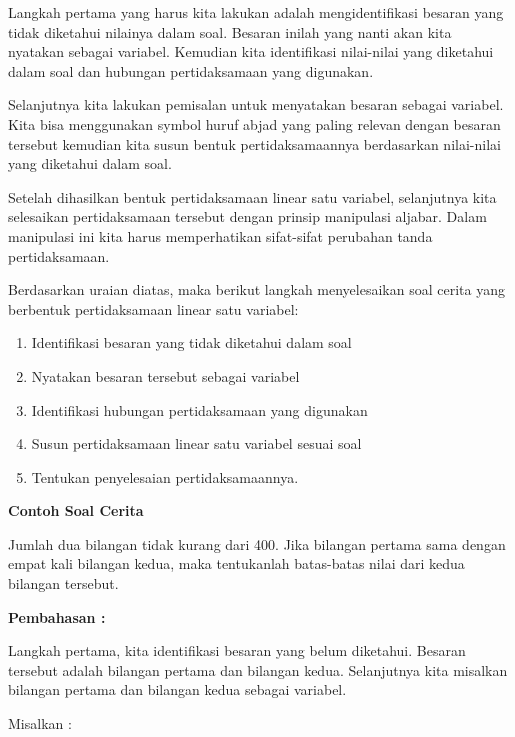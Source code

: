 \documentclass[11pt,fleqn]{book} %
\begin{document}
\noindent Langkah pertama yang harus kita lakukan adalah mengidentifikasi besaran yang tidak diketahui nilainya dalam soal. Besaran inilah yang nanti akan kita nyatakan sebagai variabel. Kemudian kita identifikasi nilai-nilai yang diketahui dalam soal dan hubungan pertidaksamaan yang digunakan.

\noindent Selanjutnya kita lakukan pemisalan untuk menyatakan besaran sebagai variabel. Kita bisa menggunakan symbol huruf abjad yang paling relevan dengan besaran tersebut kemudian kita susun bentuk pertidaksamaannya berdasarkan nilai-nilai yang diketahui dalam soal.

\noindent Setelah dihasilkan bentuk pertidaksamaan linear satu variabel, selanjutnya kita selesaikan pertidaksamaan tersebut dengan prinsip manipulasi aljabar. Dalam manipulasi ini kita harus memperhatikan sifat-sifat perubahan tanda pertidaksamaan.

\noindent Berdasarkan uraian diatas, maka berikut langkah menyelesaikan soal cerita yang berbentuk pertidaksamaan linear satu variabel:

\begin{enumerate}
\item  Identifikasi besaran yang tidak diketahui dalam soal

\item  Nyatakan besaran tersebut sebagai variabel

\item  Identifikasi hubungan pertidaksamaan yang digunakan

\item  Susun pertidaksamaan linear satu variabel sesuai soal 

\item  Tentukan penyelesaian pertidaksamaannya.
\end{enumerate}

\noindent \textbf{Contoh Soal Cerita}

\noindent Jumlah dua bilangan tidak kurang dari 400. Jika bilangan pertama sama dengan empat kali bilangan kedua, maka tentukanlah batas-batas nilai dari kedua bilangan tersebut.

\noindent \textbf{Pembahasan :}

\noindent Langkah pertama, kita identifikasi besaran yang belum diketahui. Besaran tersebut adalah bilangan pertama dan bilangan kedua. Selanjutnya kita misalkan bilangan pertama dan bilangan kedua sebagai variabel.

\noindent Misalkan :
\end{document}

